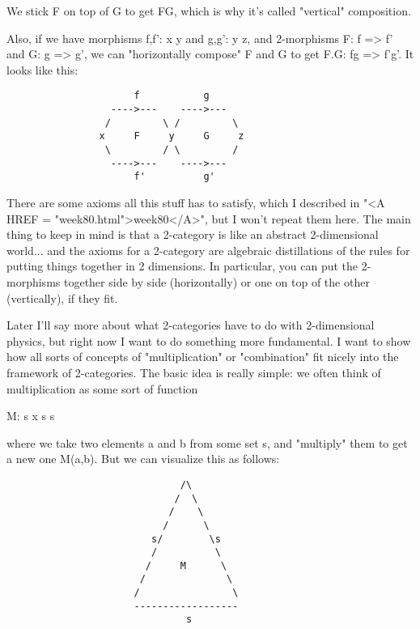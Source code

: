 We stick F on top of G to get FG, which is why it's called "vertical"
composition.

Also, if we have morphisms f,f': x \to  y and g,g': y \to  z, and 2-morphisms
F: f => f' and G: g => g', we can "horizontally compose" F and G to get
F.G: fg => f'g'.  It looks like this:

\begin{verbatim}
                      f           g
                  ---->---    ---->---
                 /         \ /         \
                x     F     y     G     z
                 \         / \         /
                  ---->---    ---->---
                      f'          g' 

\end{verbatim}
    
There are some axioms all this stuff has to satisfy, which I described
in "<A HREF = "week80.html">week80</A>", but I won't repeat them here.  The main thing to keep in
mind is that a 2-category is like an abstract 2-dimensional world... and
the axioms for a 2-category are algebraic distillations of the rules for
putting things together in 2 dimensions.  In particular, you can put the
2-morphisms together side by side (horizontally) or one on top of the
other (vertically), if they fit.   

Later I'll say more about what 2-categories have to do with
2-dimensional physics, but right now I want to do something more 
fundamental.  I want to show how all sorts of concepts of
"multiplication" or "combination" fit nicely into the framework of
2-categories.   The basic idea is really simple: we often think of
multiplication as some sort of function

M: s x s \to  s

where we take two elements a and b from some set s, and "multiply" them
to get a new one M(a,b).  But we can visualize this as follows:

\begin{verbatim}
                              /\
                             /  \
                            /    \
                           /      \
                         s/        \s
                         /          \
                        /     M      \
                       /              \
                      /                \
                      ------------------
                               s

\end{verbatim}
    
